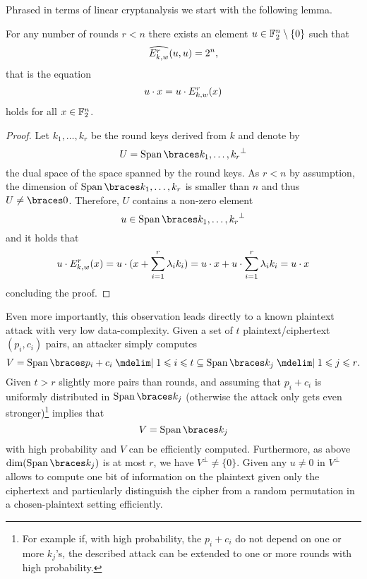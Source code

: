 Phrased in terms of linear cryptanalysis we start with the following lemma.
\begin{lemma}\label{lem:wsn:prob_one_mask}
    For any number of rounds $r<n$ there exists an element $u \in \mathbb{F}_2^n\setminus\{0\}$ such that
    \begin{equation*}
        \widehat{E_{k,w}^r}(u,u)=2^n,
    \end{equation*}
    that is the equation
    \begin{equation*}
        u \cdot x = u \cdot E_{k,w}^r(x)
    \end{equation*}
    holds for all $x \in \mathbb{F}_2^n$.
\end{lemma}
\begin{proof}
    Let $k_1, \dots, k_{r}$ be the round keys derived from $k$ and denote by
    \begin{equation*}
        U = \Span{k_1, \dots, k_{r}}^{\perp}
    \end{equation*}
    the dual space of the space spanned by the round keys.
    As $r<n$ by assumption, the dimension of $\Span{k_1, \dots, k_{r}}$ is smaller than $n$ and thus $U \neq \set{0}$.
    Therefore, $U$ contains a non-zero element
    \begin{equation*}
        u \in \Span{k_1, \dots, k_{r}}^{\perp}
    \end{equation*}
    and it holds that
    \begin{equation*}
        u \cdot E_{k,w}^r(x)
        = u \cdot (x + \sum_{i=1}^{r} \lambda_i k_i)
        = u \cdot x + u \cdot \sum_{i=1}^{r} \lambda_i k_i
        = u \cdot x
    \end{equation*}
    concluding the proof.
\end{proof}

Even more importantly, this observation leads directly to a known plaintext attack with very low data-complexity.
Given a set of $t$ plaintext/ciphertext $(p_i,c_i)$ pairs, an attacker simply computes
\begin{equation*}
    V = \Span{p_i+c_i \given 1 \leqslant i \leqslant t} \subseteq \Span{k_j \given 1 \leqslant j \leqslant r}.
\end{equation*}
Given $t > r$  slightly more pairs than rounds, and assuming that $p_i+c_i$ is uniformly distributed in $\Span{k_j}$ (otherwise the attack only gets even stronger)\footnote{%
    For example if, with high probability, the $p_i + c_i$ do not depend on one or more $k_j$'s, the described attack can be extended to one or more rounds with high probability.
}
implies that
\begin{equation*}
    V= \Span{k_j}
\end{equation*}
with high probability and $V$ can be efficiently computed.
Furthermore, as above $\dim(\Span{k_j})$ is at most $r$, we have $V^{\perp} \ne \{0\}$.
Given any $u \ne 0$ in $V^\perp$ allows to compute one bit of information on the plaintext given only the ciphertext and particularly distinguish the cipher from a random permutation in a chosen-plaintext setting efficiently.

